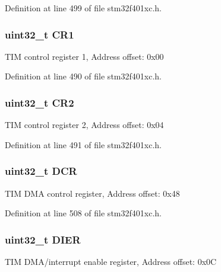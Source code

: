Definition at line 499 of file stm32f401xc.\+h.

\subsubsection[{\texorpdfstring{C\+R1}{CR1}}]{ uint32\+\_\+t C\+R1}\hypertarget{struct_t_i_m___type_def_ab0ec7102960640751d44e92ddac994f0}{}\label{struct_t_i_m___type_def_ab0ec7102960640751d44e92ddac994f0}
T\+IM control register 1, Address offset\+: 0x00 

Definition at line 490 of file stm32f401xc.\+h.

\subsubsection[{\texorpdfstring{C\+R2}{CR2}}]{ uint32\+\_\+t C\+R2}\hypertarget{struct_t_i_m___type_def_afdfa307571967afb1d97943e982b6586}{}\label{struct_t_i_m___type_def_afdfa307571967afb1d97943e982b6586}
T\+IM control register 2, Address offset\+: 0x04 

Definition at line 491 of file stm32f401xc.\+h.

\subsubsection[{\texorpdfstring{D\+CR}{DCR}}]{ uint32\+\_\+t D\+CR}\hypertarget{struct_t_i_m___type_def_af6225cb8f4938f98204d11afaffd41c9}{}\label{struct_t_i_m___type_def_af6225cb8f4938f98204d11afaffd41c9}
T\+IM D\+MA control register, Address offset\+: 0x48 

Definition at line 508 of file stm32f401xc.\+h.

\subsubsection[{\texorpdfstring{D\+I\+ER}{DIER}}]{ uint32\+\_\+t D\+I\+ER}\hypertarget{struct_t_i_m___type_def_a07fccbd85b91e6dca03ce333c1457fcb}{}\label{struct_t_i_m___type_def_a07fccbd85b91e6dca03ce333c1457fcb}
T\+IM D\+M\+A/interrupt enable register, Address offset\+: 0x0C 

